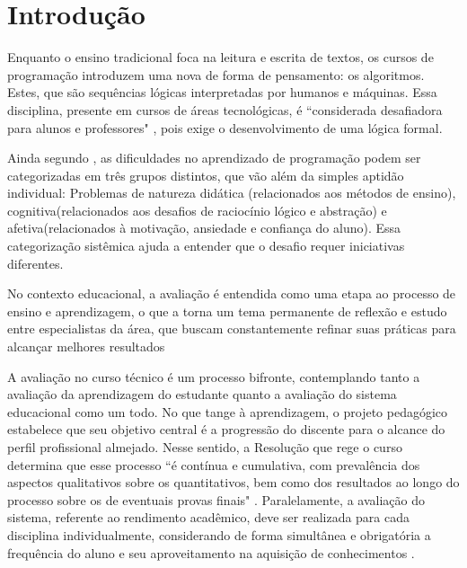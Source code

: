 
\chapter{Introdução}\label{cap:introducao}


Enquanto o ensino tradicional foca na leitura e escrita de textos, os cursos de programação introduzem uma nova
de forma de pensamento: os algoritmos. Estes, que são sequências lógicas interpretadas por humanos 
e máquinas. Essa disciplina, presente em cursos de áreas tecnológicas, é ``considerada desafiadora para alunos 
e professores" \cite{raabe2005ambiente}, pois exige o desenvolvimento de uma lógica formal.

Ainda segundo \cite{raabe2005ambiente}, as dificuldades no aprendizado de programação podem ser categorizadas
em três grupos distintos, que vão além da simples aptidão individual: Problemas de natureza didática 
(relacionados aos métodos de ensino), cognitiva(relacionados aos desafios de raciocínio lógico e  abstração) e 
afetiva(relacionados à motivação, ansiedade e confiança do aluno). Essa categorização sistêmica ajuda a
entender que o desafio requer iniciativas diferentes.  

No contexto educacional, a avaliação é entendida como uma etapa ao processo de ensino e aprendizagem, o que a 
torna um tema permanente de reflexão e estudo entre especialistas da área, que buscam constantemente refinar 
suas práticas para alcançar melhores resultados \cite{lima2022avaliaccao}

A avaliação no curso técnico é um processo bifronte, contemplando tanto a avaliação da aprendizagem do 
estudante quanto a avaliação do sistema educacional como um todo. No que tange à aprendizagem, o projeto 
pedagógico estabelece que seu objetivo central é a progressão do discente para o alcance do perfil profissional
almejado. Nesse sentido, a Resolução que rege o curso determina que esse processo ``é contínua e cumulativa,
com prevalência dos aspectos qualitativos sobre os quantitativos, bem como dos resultados ao longo do processo 
sobre os de eventuais provas finais" \cite{IFAM2020}. Paralelamente, a avaliação do sistema, referente ao 
rendimento acadêmico, deve ser realizada para cada disciplina individualmente, considerando de forma simultânea 
e obrigatória a frequência do aluno e seu aproveitamento na aquisição de conhecimentos \cite{IFAM2020}.


